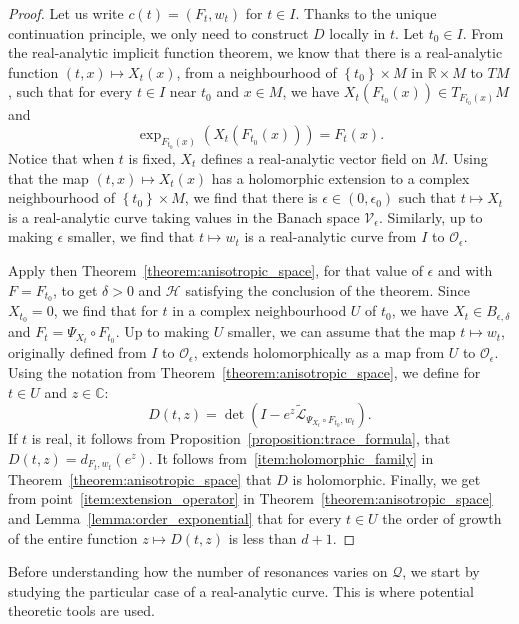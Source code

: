 \documentclass[10pt]{amsart}
\theoremstyle{definition}\newtheorem{defi}[theo]{Definition}\newtheorem{rema}[theo]{Remark}\newtheorem{exam}[theo]{Example}\newtheorem{exem}[theo]{Example}\newtheorem{nota}[theo]{Notation}
\newcommand{\set}[1]{\left\{ #1 \right\}}
\newcommand{\p}[1]{\left(#1\right)}
\newcommand{\clO}{\mathcal{O}}
\newcommand{\clL}{\mathcal{L}}
\newcommand{\clH}{\mathcal{H}}
\newcommand{\clV}{\mathcal{V}}
\newcommand{\clQ}{\mathcal{Q}}
\newcommand{\bbC}{\mathbb{C}}
\newcommand{\bbR}{\mathbb{R}}
\begin{document}
\begin{proof}
Let us write $c(t) = (F_t,w_t)$ for $t \in I$. Thanks to the unique continuation principle, we only need to construct $D$ locally in $t$. Let $t_0 \in I$. From the real-analytic implicit function theorem, we know that there is a real-analytic function $(t,x) \mapsto X_t(x)$, from a neighbourhood of $\set{t_0} \times M$ in $\bbR \times M$ to $TM$, such that for every $t \in I$ near $t_0$ and $x \in M$, we have $X_t(F_{t_0}(x)) \in T_{F_{t_0}(x)} M$ and
\begin{equation*}
\exp_{F_{t_0}(x)}\p{X_t(F_{t_0}(x))} = F_t(x).
\end{equation*}
Notice that when $t$ is fixed, $X_t$ defines a real-analytic vector field on $M$. Using that the map $(t,x) \mapsto X_t(x)$ has a holomorphic extension to a complex neighbourhood of $\set{t_0} \times M$, we find that there is $\epsilon \in (0,\epsilon_0)$ such that $t \mapsto X_t$ is a real-analytic curve taking values in the Banach space $\clV_\epsilon$. Similarly, up to making $\epsilon$ smaller, we find that $t \mapsto w_t$ is a real-analytic curve from $I$ to $\clO_\epsilon$.

Apply then Theorem~\ref{theorem:anisotropic_space}, for that value of $\epsilon$ and with $F = F_{t_0}$, to get $\delta > 0$ and $\clH$ satisfying the conclusion of the theorem. Since $X_{t_0} = 0$, we find that for $t$ in a complex neighbourhood $U$ of $t_0$, we have $X_t \in B_{\epsilon,\delta}$ and $F_t = \Psi_{X_t} \circ F_{t_0}$. Up to making $U$ smaller, we can assume that the map $t \mapsto w_t$, originally defined from $I$ to $\clO_\epsilon$, extends holomorphically as a map from $U$ to $\clO_\epsilon$. Using the notation from Theorem~\ref{theorem:anisotropic_space}, we define for $t \in U$ and $z \in \bbC$:
\begin{equation*}
D(t,z) = \det\p{ I - e^z \widetilde{\clL}_{\Psi_{X_t} \circ F_{t_0},w_t}}.
\end{equation*}
If $t$ is real, it follows from Proposition~\ref{proposition:trace_formula}, that $D(t,z) = d_{F_t,w_t}(e^z)$. It follows from~\eqref{item:holomorphic_family} in Theorem~\ref{theorem:anisotropic_space} that $D$ is holomorphic. Finally, we get from point~\eqref{item:extension_operator} in Theorem~\ref{theorem:anisotropic_space} and Lemma~\ref{lemma:order_exponential} that for every $t \in U$ the order of growth of the entire function $z \mapsto D(t,z)$ is less than $d+1$.
\end{proof}

Before understanding how the number of resonances varies on $\clQ$, we start by studying the particular case of a real-analytic curve. This is where potential theoretic tools are used.
\end{document}
